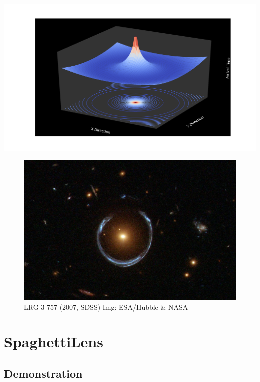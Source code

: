 \documentclass[aspectratio=1610]{beamer}
\begin{document}
\begin{frame}
  \includegraphics[width=\textwidth]{imgs/fig2}
\end{frame}

\begin{frame}
  \begin{figure}
    \includegraphics[height=0.9\textheight]{imgs/einsteinring}
    \caption{LRG 3-757 (2007, SDSS) Img: ESA/Hubble \& NASA}
  \end{figure}
\end{frame}

\section{SpaghettiLens}
\subsection{Demonstration}
\end{document}
